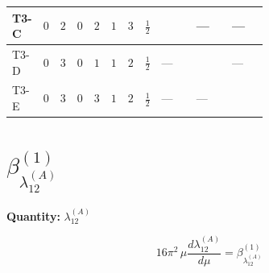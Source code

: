 \documentclass[8pt]{article}
\begin{document}
\begin{landscape}
\begin{longtable}{@{}llcccccc >{\raggedright\arraybackslash}p{0.21\linewidth} >{\raggedright\arraybackslash}p{0.21\linewidth} >{\raggedright\arraybackslash}p{0.21\linewidth}@{}}
\midrule
T3-C & $0$ & $2$ & $0$ & $2$ & $1$ & $3$ & $\frac{1}{2}$ & \scriptsize\adjustbox{max width=\linewidth}{$\begin{gathered} {\lambda_5} \left(\frac{3}{2} T_{\nu}^{(1)}+\frac{3}{2} T_{\nu}^{(2)}+6 \operatorname{Tr}\!\left({Y_d}\,\left({Y_d}\right)^{\dagger}\right)+2 \operatorname{Tr}\!\left({Y_e}\,\left({Y_e}\right)^{\dagger}\right)+6 \operatorname{Tr}\!\left({Y_u}\,\left({Y_u}\right)^{\dagger}\right)+\frac{{\lambda_{12}^{(A)}}}{6}+\frac{2 {\lambda_{HS_1}^{(A)}}}{3}+2 {\lambda_{HS_2}^{(A)}}\right)\end{gathered}$} & --- & --- \\
\midrule
T3-D & $0$ & $3$ & $0$ & $1$ & $1$ & $2$ & $\frac{1}{2}$ & --- & \scriptsize\adjustbox{max width=\linewidth}{$\begin{gathered} {\lambda_5} (T_{\nu}^{(1)}+2 T_{\nu}^{(2)}+6 \operatorname{Tr}\!\left({Y_d}\,\left({Y_d}\right)^{\dagger}\right)+2 \operatorname{Tr}\!\left({Y_e}\,\left({Y_e}\right)^{\dagger}\right)+6 \operatorname{Tr}\!\left({Y_u}\,\left({Y_u}\right)^{\dagger}\right)-4 {\lambda_{HS_1}^{(A)}})\end{gathered}$} & --- \\
\midrule
T3-E & $0$ & $3$ & $0$ & $3$ & $1$ & $2$ & $\frac{1}{2}$ & --- & --- & \scriptsize\adjustbox{max width=\linewidth}{$\begin{gathered} {\lambda_5} \left(T_{\nu}^{(1)}+T_{\nu}^{(2)}+6 \operatorname{Tr}\!\left({Y_d}\,\left({Y_d}\right)^{\dagger}\right)+2 \operatorname{Tr}\!\left({Y_e}\,\left({Y_e}\right)^{\dagger}\right)+6 \operatorname{Tr}\!\left({Y_u}\,\left({Y_u}\right)^{\dagger}\right)-\frac{4 {\lambda_{12}^{(A)}}}{3}-2 {\lambda_{12}^{(\times)}}-2 {\lambda_{HS_1}^{(A)}}-\frac{4 {\lambda_{HS_2}^{(A)}}}{3}\right)\end{gathered}$} \\
\midrule
\bottomrule
\end{longtable}
\clearpage
\section*{$\beta_{\lambda_{12}^{(A)}}^{(1)}$}
\noindent\textbf{Quantity: }$\lambda_{12}^{(A)}$\par\smallskip
\[16\pi^2\,\mu\frac{d \lambda_{12}^{(A)}}{d\mu}=\beta_{\lambda_{12}^{(A)}}^{(1)}\]

\end{landscape}
\end{document}
